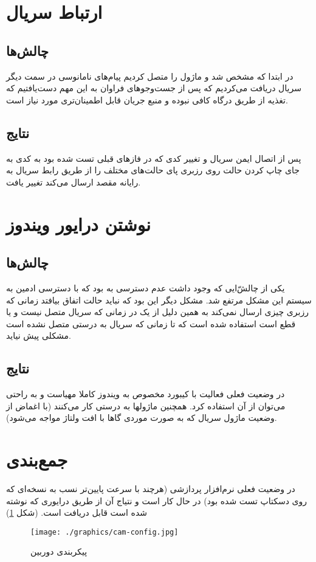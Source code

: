 \documentclass{article}
\begin{document}
\section{ارتباط سریال}
\subsection{چالش‌ها}
در ابتدا که  مشخص شد و ماژول  را متصل کردیم  پیام‌های نامانوسی در سمت دیگر سریال
دریافت می‌کردیم که پس از جست‌و‌جوهای فراوان به این مهم دست‌یافتیم که تغذیه از طریق درگاه 
کافی نبوده و منبع جریان قابل اطمینان‌تری مورد نیاز است.

\subsection{نتایج}
پس از اتصال ایمن سریال و تغییر کدی که در فازهای قبلی تست شده بود به کدی به جای چاپ کردن حالت روی رزبری پای حالت‌های مختلف را از طریق رابط سریال به رایانه مقصد ارسال می‌کند تغییر یافت.


\section{نوشتن درایور ویندوز}
\subsection{چالش‌ها}
یکی از چالش‌ّایی که وجود داشت عدم دسترسی به  بود که با دسترسی ادمین به سیستم
این مشکل مرتفع شد. مشکل دیگر این بود که نباید حالت 
اتفاق بیافتد زمانی که رزبری چیزی ارسال نمی‌کند به همین دلیل از یک 
در زمانی که سریال متصل نیست و یا قطع است استفاده شده است که
تا زمانی که سریال به درستی متصل نشده است مشکلی پیش نیاید.

\subsection{نتایج}
در وضعیت فعلی فعالیت با کیبورد مخصوص به ویندوز کاملا مهیاست و به راحتی می‌توان از آن استفاده کرد. همچنین ماژولها به درستی کار می‌کنند (با اغماض از وضعیت ماژول سریال که به صورت موردی گاها با افت ولتاژ مواجه می‌شود).


\section{جمع‌بندی}
در وضعیت فعلی نرم‌افزار پردازشی (هرچند با سرعت پایین‌تر نسب به نسخه‌ای که روی دسکتاپ تست شده بود) در حال کار است و نتیاج آن از طریق درایوری که نوشته شده است قابل دریافت است. (شکل 
\ref{pic})

\begin{figure}
	\centering
	\texttt{[image: ./graphics/cam-config.jpg]}
	\caption{پیکربندی دوربین}
	\label{pic}
\end{figure}
\end{document}
